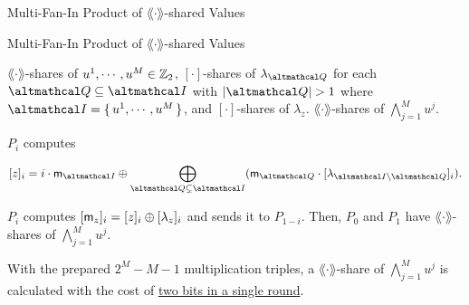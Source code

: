 \documentclass[../240906_cryptlab_flute.tex]{subfiles}
\begin{document}
\begin{frame}{Multi-Fan-In Product of \(\lang\cdot\rang\)-shared Values}
    \begin{block}{Multi-Fan-In Product of \(\lang\cdot\rang\)-shared Values}
        \begin{description}[Output]
            \ii[Input]
            \(\lang\cdot\rang\)-shares of \(u^1, \cdots, u^M \in \mathbb{Z}_2\), \([\cdot]\)-shares of
            \(\lambda_{\mcal{Q}}\) for each \(\mcal{Q} \subseteq \mcal{I}\)
            with \(|\mcal{Q}| > 1\) where \(\mcal{I} = \{\,u^1, \cdots, u^M\,\}\),
            and \([\cdot]\)-shares of \(\lambda_z\).
            \ii[Output]
            \(\lang\cdot\rang\)-shares of \(\bigwedge_{j=1}^M u^j\).
        \end{description}
        \pause
        \begin{enumerate}
            \ii
            \(P_i\) computes
            \centerline{\(\displaystyle
                [z]_i = i \cdot \msf{m}_{\mcal{I}}
                \oplus \bigoplus_{\mcal{Q} \subsetneq \mcal{I}} (\msf{m}_{\mcal{Q}}
                \cdot [\lambda_{\mcal{I} \setminus \mcal{Q}}]_i).
            \)}
            \pause
            \ii
            \(P_i\) computes \([\mathsf{m}_z]_i = [z]_i \oplus [\lambda_z]_i\)
            and sends it to \(P_{1-i}\).
            \ii
            Then, \(P_0\) and \(P_1\) have \(\lang\cdot\rang\)-shares of \(\bigwedge_{j=1}^M u^j\).
        \end{enumerate}
        \pause
        With the prepared \(2^M - M - 1\) multiplication triples,
        a \(\lang\cdot\rang\)-share of \(\bigwedge_{j=1}^M u^j\)
        is calculated with the cost of \ul{two bits in a single round}.
    \end{block}
\end{frame}
\end{document}
